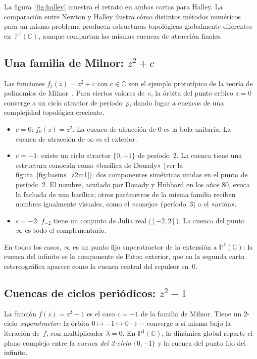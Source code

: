 \documentclass[11pt,a4paper]{article}
\theoremstyle{plain}
\theoremstyle{definition}
\theoremstyle{remark}
\newcommand{\C}{\mathbb{C}}
\newcommand{\Puno}{\mathbb{P}^1(\mathbb{C})}
\begin{document}
La figura~\ref{fig:halley} muestra el retrato en ambas cartas para Halley.
La comparación entre Newton y Halley ilustra cómo distintos métodos
numéricos para un mismo problema producen estructuras topológicas
globalmente diferentes en~$\Puno$, aunque compartan las mismas
cuencas de atracción finales.

\subsection{Una familia de Milnor: \texorpdfstring{$z^2+c$}{z2+c}}

Las funciones $f_c(z)=z^2+c$ con $c\in\C$ son el ejemplo prototípico
de la teoría de polinomios de Milnor~\cite{Milnor2006}.
Para ciertos valores de~$c$, la órbita del punto crítico $z=0$ converge
a un ciclo atractor de período~$p$, dando lugar a cuencas de una
complejidad topológica creciente.

\begin{itemize}
  \item $c=0$: $f_0(z)=z^2$. La cuenca de atracción de $0$ es la bola
        unitaria. La cuenca de atracción de $\infty$ es el exterior.
  \item $c=-1$: existe un ciclo atractor $\{0,-1\}$ de período~2.
        La cuenca tiene una estructura conocida como «basílica de Douady» (ver la figura~\ref{fig:basins_z2m1}): dos componentes simétricas unidas en el punto de período~2. El nombre, acuñado por Douady y Hubbard en los años 80, evoca la fachada de una basílica; otros parámetros de la misma familia reciben nombres igualmente visuales, como el «conejo» (período~3) o el «avión».
  \item $c=-2$: $f_{-2}$ tiene un conjunto de Julia real ($[-2,2]$). La cuenca del punto  
      $\infty$ es todo el complementario.
\end{itemize}

En todos los casos, $\infty$ es un punto fijo superatractor de la
extensión a $\Puno$: la cuenca del infinito es la componente de Fatou
exterior, que en la segunda carta estereográfica aparece como la cuenca
central del repulsor en~$0$.

\subsection{Cuencas de ciclos periódicos: \texorpdfstring{$z^2-1$}{z2-1}}
\label{ssec:pcycle_z2}

La función $f(z)=z^2-1$ es el caso $c=-1$ de la familia de Milnor.
Tiene un 2-ciclo \emph{superatractor}: la órbita $0\mapsto -1\mapsto 0\mapsto\cdots$
converge a sí misma bajo la iteración de~$f$, con multiplicador $\lambda=0$.
En $\Puno$, la dinámica global reparte el plano complejo entre la
\emph{cuenca del 2-ciclo} $\{0,-1\}$ y la cuenca del punto fijo del infinito.
\end{document}
